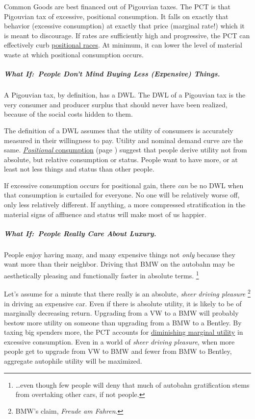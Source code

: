 Common Goods are best financed out of Pigouvian taxes.
The PCT is that Pigouvian tax of excessive, positional consumption.
It falls on exactly that behavior (excessive consumption) at exactly that price (marginal rate!) which it is meant to discourage.
If rates are sufficiently high and progressive, the PCT can effectively curb  \hyperref[sec:positional-race]{positional races}.
At minimum, it can lower the level of material waste at which positional consumption occurs.

\subparagraph{What If:~People Don't Mind Buying Less (Expensive) Things.}
A Pigouvian tax, by definition, has a DWL.
The DWL of a Pigouvian tax is the very consumer and producer surplus that should never have been realized, because of the social costs hidden to them.

The definition of a DWL assumes that the utility of consumers is accurately measured in their willingness to pay.
Utility and nominal demand curve are the same.
\hyperref[sec:positional-race]{\emph{Positional} consumption} (page \pageref{sec:positional-race})
suggest that people derive utility not from absolute, but relative consumption or status.
People want to have more, or at least not less things and status than other people.

If excessive consumption occurs for positional gain, there \emph{can} be no DWL when that consumption is curtailed for everyone.
No one will be relatively worse off, only less relatively different.
If anything, a more compressed stratification in the material signs of affluence and status will make most of us happier.

\subparagraph{What If:~People Really Care About Luxury.}
People enjoy having many, and many expensive things not \emph{only} because they want more than their neighbor.
Driving that BMW on the autobahn may be aesthetically pleasing and functionally faster in absolute terms.
\footnote{
	\ldots even though few people will deny that much of autobahn gratification stems from overtaking other cars, if not people.
}

Let's assume for a minute that there really is an absolute, \emph{sheer driving pleasure}
\footnote{
	BMW's claim, \emph{Freude am Fahren}.
}
in driving an expensive car.
Even if there is absolute utility, it is likely to be of marginally decreasing return.
Upgrading from a VW to a BMW will probably bestow more utility on someone than upgrading from a BMW to a Bentley.
By taxing big spenders more, the PCT accounts for \hyperref[sec:diminishing-marginal-utility]{diminishing marginal utility} in excessive consumption.
Even in a world of \emph{sheer driving pleasure}, when more people get to upgrade from VW to BMW and fewer from BMW to Bentley, aggregate autophile utility will be maximized.

